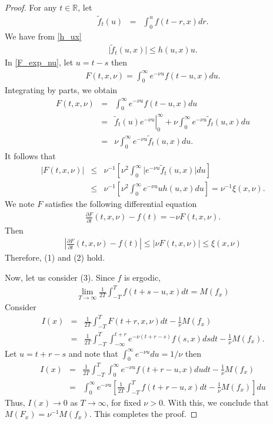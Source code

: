 \documentclass[english,reqno]{amsart}
\numberwithin{equation}{section}
\theoremstyle{plain}
\theoremstyle{definition}
\theoremstyle{remark}
\newcommand{\bb}[1]{{\mathbb{#1}}}
\begin{document}
\begin{proof}
For any $t\in \bb{R}$, let
\begin{eqnarray*}
\tilde{f}_{t}(u)&=&\int_{0}^{u}f(t-r,x)dr.
\end{eqnarray*}
We have from \eqref{h_ux}
\begin{eqnarray*}
\vert \tilde{f}_{t}(u,x)\vert\leq h(u,x) u.
\end{eqnarray*}
In \eqref{F_exp_nu}, let $u=t-s$ then
\begin{eqnarray}
F(t,x,\nu)=\int_{0}^{\infty} e^{-\nu u}f(t-u,x)du.\label{F_exp_nu_cambio_variable}
\end{eqnarray}
Integrating by parts, we obtain
\begin{eqnarray*}
F(t,x,\nu)
&=&\int_{0}^{\infty} e^{-\nu u}f(t-u,x)du\\
&=&\left. \tilde{f}_t(u)e^{-\nu u}\right\vert_{0}^{\infty}+\nu	\int_{0}^{\infty} e^{-\nu u}\tilde{f}_{t}(u,x)du\\
&=&\nu \int_{0}^{\infty} e^{-\nu u}\tilde{f}_{t}(u,x)du.
\end{eqnarray*}
It follows that
\begin{eqnarray*}
\vert F(t,x,\nu)\vert
&\leq& \nu^{-1}\left[ \nu^{2}  \int_{0}^{\infty} \vert e^{-\nu u}\tilde{f}_{t}(u,x)\vert du \right]\\
&\leq& \nu^{-1}\left[ \nu^{2}  \int_{0}^{\infty}  e^{-\nu u} u h(u,x) du \right]=\nu^{-1}\xi(x,\nu).
\end{eqnarray*}
We note $F$ satisfies the following differential equation
\begin{eqnarray*}
\frac{\partial F}{\partial t} (t,x,\nu)-f(t)=-\nu F(t,x,\nu).
\end{eqnarray*}
Then
\begin{eqnarray*}
\left\vert \frac{\partial F}{\partial t} (t,x,\nu)-f(t) \right\vert\leq \vert \nu F(t,x,\nu)\vert\leq \xi(x,\nu)
\end{eqnarray*}
Therefore, (1) and (2) hold.  

Now, let us consider (3). Since $f$ is ergodic,
\begin{eqnarray*}
\lim_{T\rightarrow \infty } \frac{1}{2T}\int_{-T}^{T} f(t+s-u,x)dt=M(f_x)
\end{eqnarray*}
Consider
\begin{eqnarray*}
I(x)&=&\frac{1}{2T}\int_{-T}^{T} F(t+r,x,\nu)dt-\frac{1}{\nu} M(f_x)\\
&=& \frac{1}{2T}\int_{-T}^{T} \int_{-\infty}^{t+r} e^{-\nu (t+r-s)}f(s,x)ds dt-\frac{1}{\nu} M(f_x).
\end{eqnarray*}
Let $u=t+r-s$ and note that $\int_{0}^{\infty}e^{-\nu u }du=1/\nu$ then
\begin{eqnarray*}
I(x)&=& \frac{1}{2T}\int_{-T}^{T} \int^{\infty}_{0} e^{-\nu u}f(t+r-u,x)du dt-\frac{1}{\nu} M(f_x)\\
&=&\int^{\infty}_{0} e^{-\nu u} \left[\frac{1}{2T}\int_{-T}^{T}  f(t+r-u,x)dt-\frac{1}{\nu} M(f_x)\right]du
\end{eqnarray*}
Thus, $I(x)\rightarrow 0$ as $T\rightarrow \infty$, for fixed $\nu>0$.  
With this, we conclude that $M(F_x)=\nu^{-1}M(f_x)$.  
This completes the proof.
\end{proof}
\end{document}

